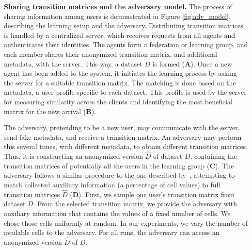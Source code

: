 \documentclass{article}
\begin{document}
\textbf{Sharing transition matrices and the adversary model.} The process of sharing information among users is demonstrated in Figure \ref{fig:adv_model}, describing the learning setup and the adversary. Distributing transition matrices is handled by a centralized server, which receives requests from all agents and authenticates their identities. The agents form a federation or learning group, and each member shares their anonymized transition matrix, and additional metadata, with the server. This way, a dataset $D$ is formed (\textbf{A}). Once a new agent has been added to the system, it initiates the learning process by asking the server for a suitable transition matrix. The matching is done based on the metadata, a user profile specific to each dataset. This profile is used by the server for measuring similarity across the clients and identifying the most beneficial matrix for the new arrival (\textbf{B}).

The adversary, pretending to be a new user, may communicate with the server, send fake metadata, and receive a transition matrix. An adversary may perform this several times, with different metadata, to obtain different transition matrices. Thus, it is constructing an anonymized version $\hat{D}$ of dataset $D$, containing the transition matrices of potentially all the users in the learning group (\textbf{C}). %
The adversary follows a similar procedure to the one described by~\citet{Narayanan2008}, attempting to match collected auxiliary information (a percentage of cell values) to full transition matrices $\hat{D}$ (\textbf{D}). First, we sample one user's transition matrix from dataset $D$. From the selected transition matrix, we provide the adversary with auxiliary information that contains the values of a fixed number of cells. We chose those cells uniformly at random. In our experiments, we vary the number of available cells to the adversary. For all runs, the adversary can access an anonymized version $\hat{D}$ of $D$. 

 
\end{document}
